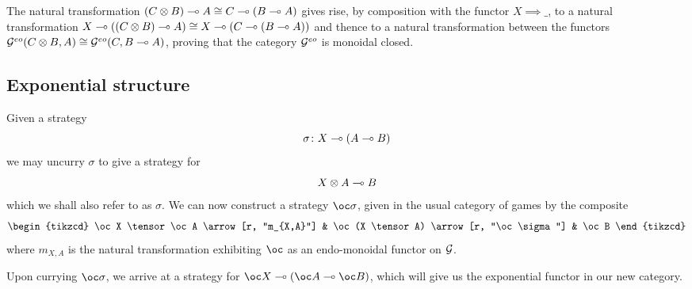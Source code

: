 \documentclass{article}
\begin{document}
The natural transformation $(C\otimes B)\multimap A \cong C\multimap (B\multimap A)$ gives rise, by composition with the functor $X\implies\_$, to a natural transformation $X\multimap ((C\otimes B) \multimap A) \cong X\multimap (C\multimap (B\multimap A))$ and thence to a natural transformation between the functors $\mathcal G^{eo}(C\otimes B,A)\cong \mathcal G^{eo}(C,B\multimap A)$, proving that the category $\mathcal G^{eo}$ is monoidal closed.

\subsection{Exponential structure}

Given a strategy
\[
  \sigma\colon X \multimap (A \multimap B)
  \]
we may uncurry $\sigma$ to give a strategy for
\[
  X \otimes A \multimap B
  \]
which we shall also refer to as $\sigma$.  
We can now construct a strategy $\oc \sigma$, given in the usual category of games by the composite
\[
  \begin{tikzcd}
    \oc X \tensor \oc A \arrow[r, "m_{X,A}"]
      & \oc (X \tensor A) \arrow[r, "\oc \sigma"]
        & \oc B
  \end{tikzcd}
  \]
where $m_{X,A}$ is the natural transformation exhibiting $\oc$ as an endo-monoidal functor on $\mathcal G$.  

Upon currying $\oc \sigma$, we arrive at a strategy for $\oc X \implies (\oc A \implies \oc B)$, which will give us the exponential functor in our new category.  
\end{document}
